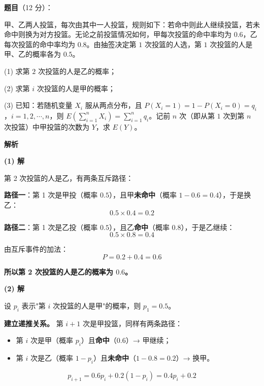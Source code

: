 \begin{answer}

\textbf{题目}（12 分）：

甲、乙两人投篮，每次由其中一人投篮，规则如下：若命中则此人继续投篮，若未命中则换为对方投篮。无论之前投篮情况如何，甲每次投篮的命中率均为 $0.6$，乙每次投篮的命中率均为 $0.8$。由抽签决定第 $1$ 次投篮的人选，第 $1$ 次投篮的人是甲、乙的概率各为 $0.5$。

  (1) 求第 $2$ 次投篮的人是乙的概率；

  (2) 求第 $i$ 次投篮的人是甲的概率；

  (3) 已知：若随机变量 $X_i$ 服从两点分布，且 $P\left(X_i=1\right)=1-P\left(X_i=0\right)=q_i$，$i=1,2,\cdots,n$，则 $E\left(\displaystyle\sum_{i=1}^{n}X_i\right)=\displaystyle\sum_{i=1}^{n}q_i$。记前 $n$ 次（即从第 $1$ 次到第 $n$ 次投篮）中甲投篮的次数为 $Y$，求 $E(Y)$。

\textbf{解析}

\par\medskip

\textbf{(1) 解}

第 2 次投篮的人是乙，有两条互斥路径：

\textbf{路径一}：第 1 次是甲投（概率 $0.5$），且甲\textbf{未命中}（概率 $1-0.6=0.4$），于是换乙：
\nopagebreak[4]
\[0.5\times0.4=0.2\]

\textbf{路径二}：第 1 次是乙投（概率 $0.5$），且乙\textbf{命中}（概率 $0.8$），于是乙继续：
\nopagebreak[4]
\[0.5\times0.8=0.4\]

由互斥事件的加法：
\nopagebreak[4]
\[P=0.2+0.4=0.6\]

\textbf{所以第 2 次投篮的人是乙的概率为 $0.6$。}

\par\medskip

\textbf{(2) 解}

设 $p_i$ 表示"第 $i$ 次投篮的人是甲"的概率，则 $p_1=0.5$。

\textbf{建立递推关系。} 第 $i+1$ 次是甲投篮，同样有两条路径：

\begin{itemize}
\item 第 $i$ 次是甲（概率 $p_i$）且\textbf{命中}（$0.6$）→ 甲继续；
\item 第 $i$ 次是乙（概率 $1-p_i$）且\textbf{未命中}（$1-0.8=0.2$）→ 换甲。
\end{itemize}

\nopagebreak[4]
\[p_{i+1}=0.6p_i+0.2\left(1-p_i\right)=0.4p_i+0.2\]


\end{answer}
